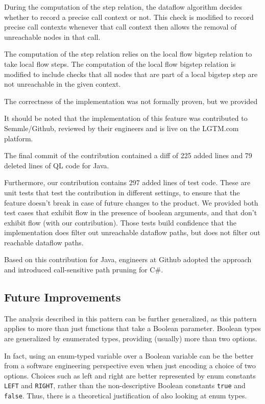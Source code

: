 During the computation of the step relation, the dataflow algorithm 
decides whether to record a precise call context or not.
This check is modified to record precise call contexts whenever that call context 
then allows the removal of unreachable nodes in that call.

The computation of the step relation relies on the local flow bigstep relation
to take local flow steps.
The computation of the local flow bigstep relation is modified to include checks 
that all nodes that are part of a local bigstep step are not unreachable in the 
given context.

The correctness of the implementation was not formally proven, but we provided 

It should be noted that the implementation of this feature was contributed to Semmle/Github,
reviewed by their engineers and is live on the LGTM.com platform.

The final commit of the contribution contained a diff of 225 added lines and 
79 deleted lines of QL code for Java.

Furthermore, our contribution contains 297 added lines of test code.
These are unit tests that test the contribution in different settings, to ensure 
that the feature doesn't break in case of future changes to the product.
We provided both test cases that exhibit flow in the presence of boolean 
arguments, and that don't exhibit flow (with our contribution).
Those tests build confidence that the implementation does filter out unreachable 
dataflow paths, but does not filter out reachable dataflow paths.

Based on this contribution for Java, engineers at Github adopted 
the approach and introduced call-sensitive path pruning for C\#.

\subsection{Future Improvements}
The analysis described in this pattern can be further generalized, as
this pattern applies to more than just functions that take a Boolean parameter.
Boolean types are generalized by enumerated types, providing (usually) more than two options.

In fact, using an enum-typed variable over a Boolean variable can be the better
 from a software engineering perspective
even when just encoding a choice of two options.
Choices such as left and right are better represented 
by enum constants \texttt{LEFT} and \texttt{RIGHT}, rather than the 
non-descriptive Boolean constants \texttt{true} and \texttt{false}.
Thus, there is a theoretical justification of also looking at enum types.

